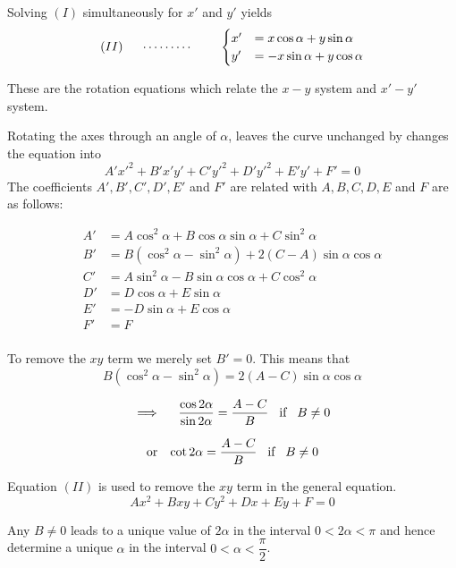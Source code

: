 \documentclass[11pt,a4paper]{article}
\theoremstyle{definition}
\begin{document}
Solving $(I)$ simultaneously for $x'$ and $y'$ yields
$$(II)\hspace{0.5cm}\cdots\cdots\cdots\hspace{0.8cm} 
\begin{cases}
x' & = x\cos \alpha + y\sin \alpha\\
y' & = -x\sin \alpha + y\cos \alpha
\end{cases}
$$

These are the rotation equations which relate the $x-y$ system and $x'-y'$ system.


Rotating the axes through an angle of $\alpha$, leaves the curve unchanged by changes the equation into $$A'x'^2 + B'x'y' + C'y'^2 + D'y'^2 + E'y' + F' = 0$$ 
The coefficients $A', B', C', D', E'$ and $F'$ are related with $A, B, C, D, E$ and $F$ are as follows:

\begin{align*}
A' & = A\cos^2\alpha + B\cos\alpha\sin\alpha + C\sin^2\alpha\\
B' &  = B(\cos^2\alpha - \sin^2\alpha) + 2(C-A)\sin\alpha\cos\alpha\\
C' & = A\sin^2 \alpha - B\sin \alpha \cos \alpha + C\cos^2\alpha\\
D' & = D\cos \alpha + E\sin \alpha\\
E' &  = -D\sin \alpha + E \cos \alpha\\
F' & = F\\
\end{align*}

To remove the $xy$ term we merely set $B' =0$. This means that $$B(\cos^2\alpha - \sin^2\alpha) = 2(A-C)\sin\alpha\cos\alpha$$

$$\implies\hspace{0.4cm} \frac{\cos 2\alpha}{\sin 2\alpha} = \frac{A - C}{B}\hspace{0.3cm} \text{if}\hspace{0.3cm} B\neq 0$$

$$\text{or}\hspace{0.3cm} \cot 2\alpha = \dfrac{A - C}{B}\hspace{0.3cm} \text{if}\hspace{0.3cm} B \neq 0$$

Equation $(II)$ is used to remove the $xy$ term in the general equation.
$$Ax^2 + Bxy + Cy^2 + Dx + Ey + F = 0$$

Any $B\neq 0$ leads to a unique value of $2\alpha$ in the interval $0< 2\alpha <\pi$ and hence determine a unique $\alpha$ in the interval $0< \alpha < \dfrac{\pi}{2}$.
\end{document}
